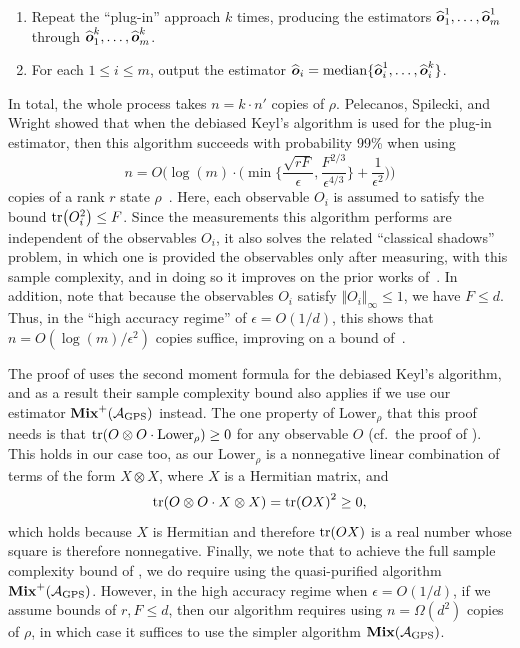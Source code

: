 \documentclass{article}
\newcommand{\mixed}{\textup{\textbf{Mix}}}
\newcommand{\gps}{\calA_{\mathrm{GPS}}}
\begin{document}
\begin{enumerate}
    \item Repeat the ``plug-in'' approach $k$ times, producing the estimators $\widehat{\boldsymbol{o}}_1^1, \ldots, \widehat{\boldsymbol{o}}_m^1$ through $\widehat{\boldsymbol{o}}_1^k, \ldots, \widehat{\boldsymbol{o}}_m^k$.
    \item For each $1 \leq i \leq m$, output the estimator $\widehat{\boldsymbol{o}}_i = \mathrm{median}\{\widehat{\boldsymbol{o}}_i^1, \ldots, \widehat{\boldsymbol{o}}_i^k\}$.
\end{enumerate}
In total, the whole process takes $n = k \cdot n'$ copies of $\rho$.
Pelecanos, Spilecki, and Wright showed that when the debiased Keyl's algorithm is used for the plug-in estimator, then this algorithm succeeds with probability 99\% when using
    \begin{equation}\label{eq:shadow-tomograph-bound}
            n =O\Big(\log(m) \cdot \Big(\min\Big\{\frac{\sqrt{rF}}{\epsilon}, \frac{F^{2/3}}{\epsilon^{4/3}}\Big\} + \frac{1}{\epsilon^2}\Big)\Big)
    \end{equation}
copies of a rank $r$ state $\rho$~\cite[Theorem 1.9]{PSW25}.
Here, each observable $O_i$ is assumed to satisfy the bound $\tr(O_i^2) \leq F$.
Since the measurements this algorithm performs are independent of the observables $O_i$,
it also solves the related ``classical shadows'' problem,
in which one is provided the observables only after measuring, with this sample complexity,
and in doing so it improves on the prior works of~\cite{HKP20,GLM24}.
In addition, note that because the observables $O_i$ satisfy $\Vert O_i \Vert_{\infty} \leq 1$,
we have $F \leq d$.
Thus, in the ``high accuracy regime'' of $\epsilon = O(1/d)$, this shows that $n = O(\log(m)/\epsilon^2)$ copies suffice,
improving on a bound of~\cite{CLL24b}.

 The proof of \cite{PSW25} uses the second moment formula for the debiased Keyl's algorithm,
and as a result their sample complexity bound also applies if we use our estimator $\mixed^+(\gps)$ instead.
The one property of $\mathrm{Lower}_{\rho}$ that this proof needs is that $\tr(O \otimes O \cdot \mathrm{Lower}_{\rho}) \geq 0$ for any observable $O$ (cf.\ the proof of \cite[Lemma 7.3]{PSW25}). 
This holds in our case too, as our $\mathrm{Lower}_{\rho}$ is a nonnegative linear combination of terms of the form $X \otimes X$, where $X$ is a Hermitian matrix,
and
\begin{equation*}
    \tr(O \otimes O \cdot X \otimes X)
    = \tr(O X)^2
    \geq 0,
\end{equation*}
which holds because $X$ is Hermitian and therefore $\tr(O X)$ is a real number whose square is therefore nonnegative.
Finally, we note that to achieve the full sample complexity bound of , we do require using the quasi-purified algorithm $\mixed^+(\gps)$.
However, in the high accuracy regime when $\epsilon = O(1/d)$,
if we assume bounds of $r, F \leq d$,
then our algorithm requires using $n = \Omega(d^2)$ copies of $\rho$,
in which case it suffices to use the simpler algorithm $\mixed(\gps)$.
\end{document}
